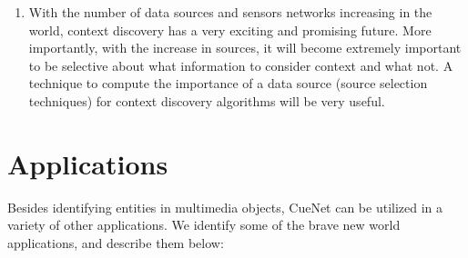 \begin{enumerate}
\item With the number of data sources and sensors networks increasing in the world, context discovery has a very exciting and promising future. More importantly, with the increase in sources, it will become extremely important to be selective about what information to consider context and what not. A technique to compute the importance of a data source (source selection techniques) for context discovery algorithms will be very useful.

\end{enumerate}

\section{Applications}
Besides identifying entities in multimedia objects, CueNet can be utilized in a variety of other applications. We identify some of the brave new world applications, and describe them below:

